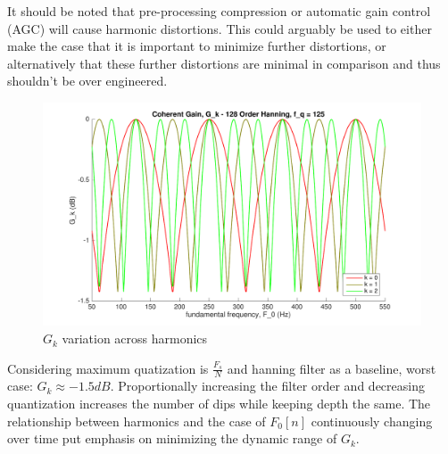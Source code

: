 \documentclass [11pt, proquest,oneside] {ganter_thesis}[2015/03/03]
\begin{document}
It should be noted that pre-processing compression or automatic gain control (AGC) will cause harmonic distortions.  This could arguably be used to either make the case that it is important to minimize further distortions, or alternatively that these further distortions are minimal in comparison and thus shouldn't be over engineered.

\begin{figure}[!ht]
  \centering
    \includegraphics[width=1\textwidth]{g_k_4}   
    \caption{$G_k$ variation across harmonics}\label{fig:g_k_4}
\end{figure}

Considering maximum quatization is $\frac{F_s}{N}$ and hanning filter as a baseline, worst case: $G_k \approx -1.5dB$.  Proportionally increasing the filter order and decreasing quantization increases the number of dips while keeping depth the same.  The relationship between harmonics and the case of $F_0[n]$ continuously changing over time put emphasis on minimizing the dynamic range of $G_k$.




\end{document}
